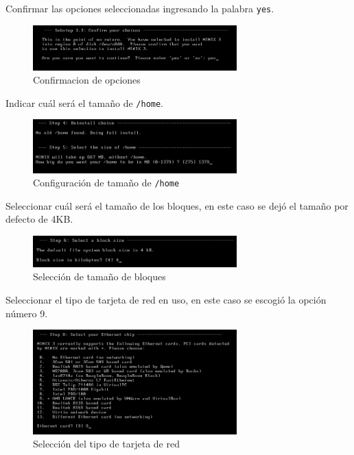 \documentclass[12pt]{article}
\begin{document}
Confirmar las opciones seleccionadas ingresando la palabra \texttt{yes}.
\begin{figure}[H]
  \centering
  \includegraphics[width=0.7\textwidth]{vm/min22.png}
  \caption{Confirmacion de opciones}
\end{figure}

Indicar cuál será el tamaño de \texttt{/home}.
\begin{figure}[H]
  \centering
  \includegraphics[width=0.7\textwidth]{vm/min24.png}
  \caption{Configuración de tamaño de \texttt{/home}}
\end{figure}

Seleccionar cuál será el tamaño de los bloques, en este caso se dejó el tamaño por defecto de 4KB.
\begin{figure}[H]
  \centering
  \includegraphics[width=0.7\textwidth]{vm/min26.png}
  \caption{Selección de tamaño de bloques}
\end{figure}

Seleccionar el tipo de tarjeta de red en uso, en este caso se escogió la opción número 9.
\begin{figure}[H]
  \centering
  \includegraphics[width=0.7\textwidth]{vm/min27.png}
  \caption{Selección del tipo de tarjeta de red}
\end{figure}
\end{document}

